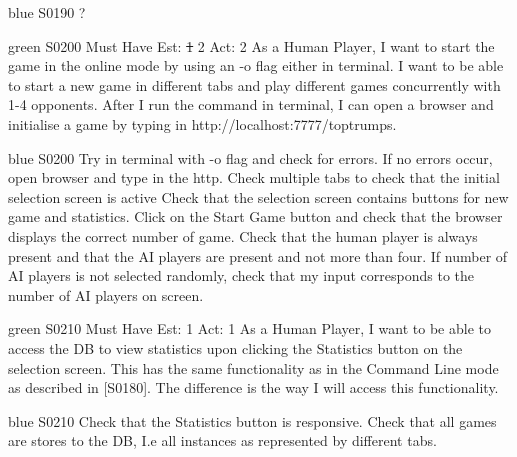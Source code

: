 \begin{card}{blue}
{S0190}{}{}{}
?
\end{card}


\newpage

\begin{card}{green}
{S0200}
{Must Have}
{Est: \st{1} 2}
{Act: 2}
As a Human Player, I want to start the game in the online mode by using an -o flag either in terminal.  
I want to be able to start a new game in different tabs and play different games concurrently with 1-4 opponents. 
After I run the command in terminal, I can open a browser and initialise a game by typing in http://localhost:7777/toptrumps.
\end{card}

\begin{card}{blue}
{S0200}{}{}{}
Try in terminal with -o flag and check for errors. 
If no errors occur, open browser and type in the http.
Check multiple tabs to check that the initial selection screen is active Check that the selection screen contains buttons for new game and statistics.
Click on the Start Game button and check that the browser displays the correct number of game. 
Check that the human player is always present and that the AI players are present and not more than four. 
If number of AI players is not selected randomly, check that my input corresponds to the number of AI players on screen.
\end{card}


\newpage

\begin{card}{green}
{S0210}
{Must Have}
{Est: 1}
{Act: 1}
As a Human Player, I want to be able to access the DB to view statistics upon clicking the Statistics button on the selection screen.
This has the same functionality as in the Command Line mode as described in [S0180].
The difference is the way I will access this functionality.
\end{card}

\begin{card}{blue}
{S0210}{}{}{}
Check that the Statistics button is responsive. 
Check that all games are stores to the DB, I.e all instances as represented by different tabs.
\end{card}


\newpage

